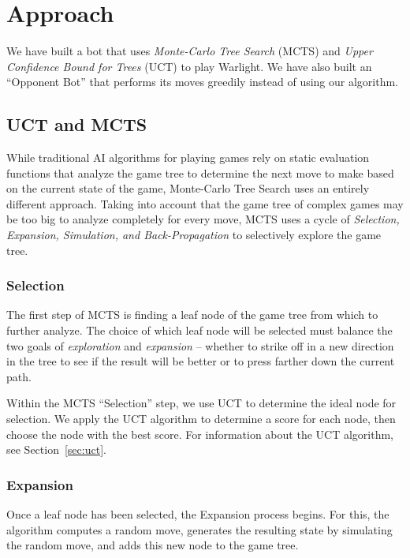 \documentclass[a4paper,11pt]{article}
\begin{document}
\section{Approach}\label{sec:approach}
We have built a bot that uses \emph{Monte-Carlo Tree Search} (MCTS) and \emph{Upper 
Confidence Bound for Trees} (UCT) to play Warlight.  We have also built an ``Opponent Bot'' 
that performs its moves greedily instead of using our algorithm.

\subsection{UCT and MCTS}
While traditional AI algorithms for playing games rely on static evaluation functions that 
analyze the game tree to determine the next move to make based on the current state of the 
game, Monte-Carlo Tree Search uses an entirely different approach.  Taking into account that 
the game tree of complex games may be too big to analyze completely for every move, MCTS 
uses a cycle of \emph{Selection, Expansion, Simulation, and Back-Propagation} to selectively 
explore the game tree.

\subsubsection{Selection}
The first step of MCTS is finding a leaf node of the game tree from which to further 
analyze.  The choice of which leaf node will be selected must balance the two goals of 
\emph{exploration} and \emph{expansion} -- whether to strike off in a new direction in the tree to see if 
the result will be better or to press farther down the current path.

Within the MCTS ``Selection'' step, we use UCT to determine the ideal node for 
selection.  We apply the UCT algorithm to determine a score for each node, then choose the 
node with the best score.  For information about the UCT algorithm, see Section~\ref{sec:uct}.

\subsubsection{Expansion}
Once a leaf node has been selected, the Expansion process begins. For this, 
the algorithm computes a random move, generates the resulting state by simulating the random move, 
and adds this new node to the game tree.
\end{document}
